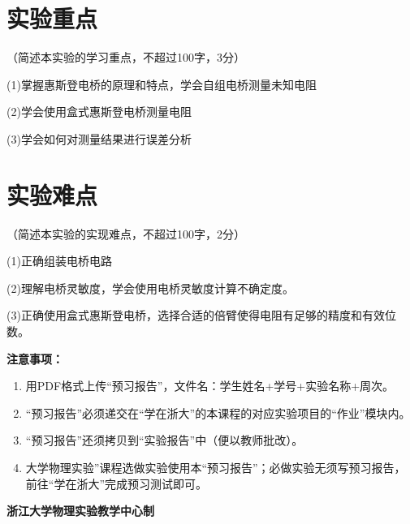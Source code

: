 \documentclass[10pt,a4paper]{ctexart}
\newcommand{\myspace}[1]{\par\vspace{#1\baselineskip}} %
\newcommand{\sihao}{\fontsize{14pt}{18pt}\selectfont}
\newcommand{\xiaosi}{\fontsize{12pt}{16pt}\selectfont}
\begin{document}
\myspace{2}
    
    \section{实验重点}
    
    \xiaosi（简述本实验的学习重点，不超过100字，3分）

(1)掌握惠斯登电桥的原理和特点，学会自组电桥测量未知电阻

(2)学会使用盒式惠斯登电桥测量电阻

(3)学会如何对测量结果进行误差分析

    \myspace{2}
    
    \section{实验难点}

    \xiaosi（简述本实验的实现难点，不超过100字，2分）

    (1)正确组装电桥电路

    (2)理解电桥灵敏度，学会使用电桥灵敏度计算不确定度。

    (3)正确使用盒式惠斯登电桥，选择合适的倍臂使得电阻有足够的精度和有效位数。
\myspace{2}


\newpage

\sihao\textbf{注意事项：}
\xiaosi
\begin{enumerate}
    \item 用PDF格式上传“预习报告”，文件名：学生姓名+学号+实验名称+周次。
    \item “预习报告”必须递交在“学在浙大”的本课程的对应实验项目的“作业”模块内。
    \item “预习报告”还须拷贝到“实验报告”中（便以教师批改）。
    \item 大学物理实验”课程选做实验使用本“预习报告”；必做实验无须写预习报告，前往“学在浙大”完成预习测试即可。
\end{enumerate}

\vspace{1cm}
\xiaosi\centering \textbf{浙江大学物理实验教学中心制}
\end{document}
